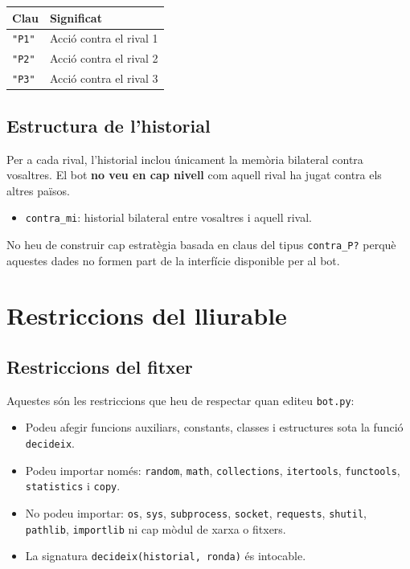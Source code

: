 \documentclass[12pt,a4paper]{report}
\begin{document}
\begin{center}
\begin{tabularx}{0.95\textwidth}{>{\ttfamily}l Y}
\toprule
Clau & Significat \\
\midrule
\texttt{"P1"} & Acció contra el rival 1 \\
\texttt{"P2"} & Acció contra el rival 2 \\
\texttt{"P3"} & Acció contra el rival 3 \\
\bottomrule
\end{tabularx}
\end{center}

\section{Estructura de l'historial}

Per a cada rival, l'historial inclou únicament la memòria bilateral contra
vosaltres. El bot \textbf{no veu en cap nivell} com aquell rival ha jugat contra
els altres països.

\begin{itemize}
  \item \texttt{contra\_mi}: historial bilateral entre vosaltres i aquell rival.
\end{itemize}

\begin{tcolorbox}[colback=softred,colframe=black,title=Detall important]
No heu de construir cap estratègia basada en claus del tipus \texttt{contra\_P?}
perquè aquestes dades no formen part de la interfície disponible per al bot.
\end{tcolorbox}

\chapter{Restriccions del lliurable}

\section{Restriccions del fitxer}

Aquestes són les restriccions que heu de respectar quan editeu \texttt{bot.py}:

\begin{itemize}
  \item Podeu afegir funcions auxiliars, constants, classes i estructures sota
  la funció \texttt{decideix}.
  \item Podeu importar només: \texttt{random}, \texttt{math},
  \texttt{collections}, \texttt{itertools}, \texttt{functools},
  \texttt{statistics} i \texttt{copy}.
  \item No podeu importar: \texttt{os}, \texttt{sys}, \texttt{subprocess},
  \texttt{socket}, \texttt{requests}, \texttt{shutil}, \texttt{pathlib},
  \texttt{importlib} ni cap mòdul de xarxa o fitxers.
  \item La signatura \texttt{decideix(historial, ronda)} és intocable.
\end{itemize}
\end{document}
